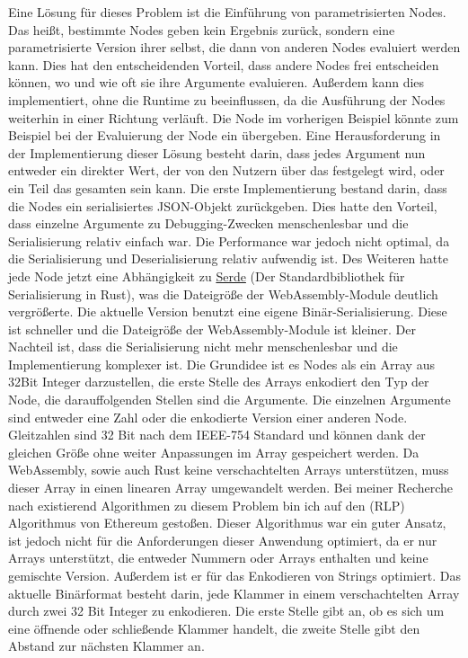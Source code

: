 \documentclass[ngerman]{article}
\begin{document}
Eine Lösung für dieses Problem ist die Einführung von parametrisierten Nodes. Das heißt, bestimmte Nodes geben kein Ergebnis zurück, sondern eine parametrisierte Version ihrer selbst, die dann von anderen Nodes evaluiert werden kann.
\br
Dies hat den entscheidenden Vorteil, dass andere Nodes frei entscheiden können, wo und wie oft sie ihre Argumente evaluieren.
Außerdem kann dies implementiert, ohne die Runtime zu beeinflussen, da die Ausführung der Nodes weiterhin in einer Richtung verläuft.
\br
Die  Node im vorherigen Beispiel könnte zum Beispiel bei der Evaluierung der  Node ein  übergeben.
\br
Eine Herausforderung in der Implementierung dieser Lösung besteht darin, dass jedes Argument nun entweder ein direkter Wert, der von den Nutzern über das  festgelegt wird, oder ein Teil das gesamten  sein kann.
\br
Die erste Implementierung bestand darin, dass die Nodes ein serialisiertes JSON-Objekt zurückgeben. Dies hatte den Vorteil, dass einzelne Argumente zu Debugging-Zwecken menschenlesbar und die Serialisierung relativ einfach war. Die Performance war jedoch nicht optimal, da die Serialisierung und Deserialisierung relativ aufwendig ist. Des Weiteren hatte jede Node jetzt eine Abhängigkeit zu \href{ https://serde.rs/ }{Serde} (Der Standardbibliothek für Serialisierung in Rust), was die Dateigröße der WebAssembly-Module deutlich vergrößerte.
\br
Die aktuelle Version benutzt eine eigene Binär-Serialisierung. Diese ist schneller und die Dateigröße der WebAssembly-Module ist kleiner. Der Nachteil ist, dass die Serialisierung nicht mehr menschenlesbar und die Implementierung komplexer ist. 
\br
Die Grundidee ist es Nodes als ein Array aus 32Bit Integer darzustellen, die erste Stelle des Arrays enkodiert den Typ der Node, die darauffolgenden Stellen sind die Argumente. Die einzelnen Argumente sind entweder eine Zahl oder die enkodierte Version einer anderen Node.
Gleitzahlen sind 32 Bit nach dem IEEE-754 Standard und können dank der gleichen Größe ohne weiter Anpassungen im Array gespeichert werden. 
\br
Da WebAssembly, sowie auch Rust keine verschachtelten Arrays unterstützen, muss dieser Array in einen linearen Array umgewandelt werden. 
Bei meiner Recherche nach existierend Algorithmen zu diesem Problem bin ich auf den  (RLP) Algorithmus von Ethereum gestoßen. Dieser Algorithmus war ein guter Ansatz, ist jedoch nicht für die Anforderungen dieser Anwendung optimiert, da er nur Arrays unterstützt, die entweder Nummern oder Arrays enthalten und keine gemischte Version. Außerdem ist er für das Enkodieren von Strings optimiert.
\cite{wood2024ethereum}
\br
Das aktuelle Binärformat besteht darin, jede Klammer in einem verschachtelten Array durch zwei 32 Bit Integer zu enkodieren. 
Die erste Stelle gibt an, ob es sich um eine öffnende oder schließende Klammer handelt, die zweite Stelle gibt den Abstand zur nächsten Klammer an.
\end{document}
